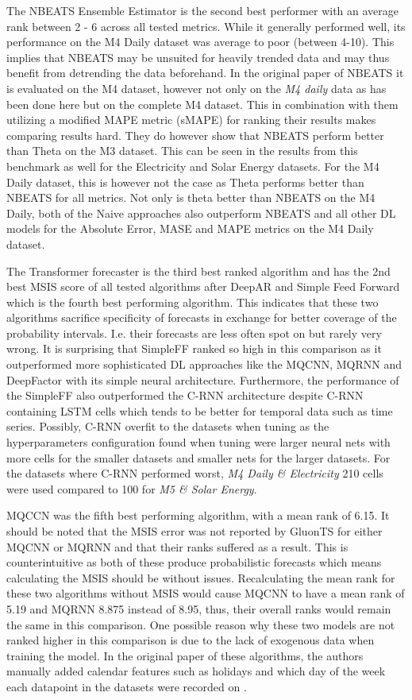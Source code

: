 The NBEATS Ensemble Estimator is the second best performer with an average rank between 2 - 6 across all tested metrics. While it generally performed well, its performance on the M4 Daily dataset was average to poor (between 4-10). This implies that NBEATS may be unsuited for heavily trended data and may thus benefit from detrending the data beforehand. In the original paper of NBEATS it is evaluated on the M4 dataset, however not only on the \textit{M4 daily} data as has been done here but on the complete M4 dataset. This in combination with them utilizing a modified MAPE metric (sMAPE) for ranking their results makes comparing results hard. They do however show that NBEATS perform better than Theta on the M3 dataset. This can be seen in the results from this benchmark as well for the Electricity and Solar Energy datasets. For the M4 Daily dataset, this is however not the case as Theta performs better than NBEATS for all metrics. Not only is theta better than NBEATS on the M4 Daily, both of the Naive approaches also outperform NBEATS and all other DL models for the Absolute Error, MASE and MAPE metrics on the M4 Daily dataset.

The Transformer forecaster is the third best ranked algorithm and has the 2nd best MSIS score of all tested algorithms after DeepAR and Simple Feed Forward which is the fourth best performing algorithm. This indicates that these two algorithms sacrifice specificity of forecasts in exchange for better coverage of the probability intervals. I.e. their forecasts are less often spot on but rarely very wrong. It is surprising that SimpleFF ranked so high in this comparison as it outperformed more sophisticated DL approaches like the MQCNN, MQRNN and DeepFactor with its simple neural architecture. Furthermore, the performance of the SimpleFF also outperformed the C-RNN architecture despite C-RNN containing LSTM cells which tends to be better for temporal data such as time series. Possibly, C-RNN overfit to the datasets when tuning as the hyperparameters configuration found when tuning were larger neural nets with more cells for the smaller datasets and smaller nets for the larger datasets. For the datasets where C-RNN performed worst, \textit{M4 Daily \& Electricity} 210 cells were used compared to 100 for \textit{M5 \& Solar Energy}.

MQCCN was the fifth best performing algorithm, with a mean rank of 6.15. It should be noted that the MSIS error was not reported by GluonTS for either MQCNN or MQRNN and that their ranks suffered as a result. This is counterintuitive as both of these produce probabilistic forecasts which means calculating the MSIS should be without issues. Recalculating the mean rank for these two algorithms without MSIS would cause MQCNN to have a mean rank of 5.19 and MQRNN 8.875 instead of 8.95, thus, their overall ranks would remain the same in this comparison. One possible reason why these two models are not ranked higher in this comparison is due to the lack of exogenous data when training the model. In the original paper of these algorithms, the authors manually added calendar features such as holidays and which day of the week each datapoint in the datasets were recorded on \cite{wen_multi-horizon_2018}.

